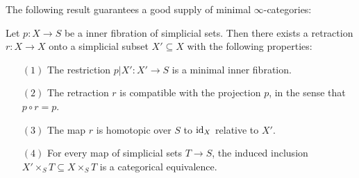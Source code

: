 The following result guarantees a good supply of minimal $\infty$-categories:

\begin{proposition}\label{minimod}
Let $p: X \rightarrow S$ be a inner fibration of simplicial sets. Then there exists
a retraction $r: X \rightarrow X$ onto a simplicial subset $X' \subseteq X$ with the following
properties:
\begin{itemize}
\item[$(1)$] The restriction $p|X': X' \rightarrow S$ is a minimal inner fibration.
\item[$(2)$] The retraction $r$ is compatible with the projection $p$, in the sense that
$p \circ r = p$.
\item[$(3)$] The map $r$ is homotopic over $S$ to $\operatorname{id}_{X}$ relative to $X'$.
\item[$(4)$] For every map of simplicial sets $T \rightarrow S$, the induced inclusion
$X' \times_{S} T \subseteq X \times_{S} T$ is a categorical equivalence.
\end{itemize}
\end{proposition}

